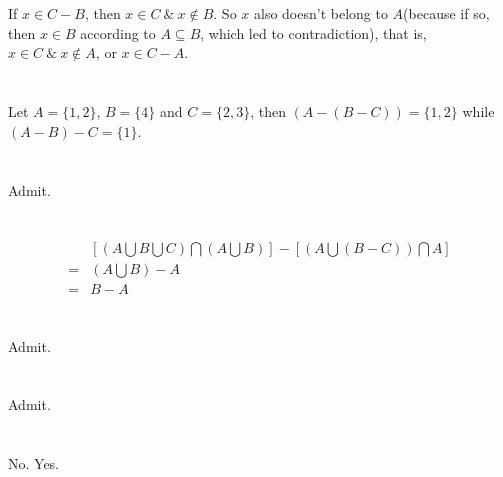 \section{}
If $ x \in C-B $, then $ x\in C\ \&\ x\notin B $. So $x$ also doesn't belong to
$A$(because if so, then $ x\in B $ according to $ A\subseteq B $, which led to 
contradiction), that is, $ x\in C\ \&\ x\notin A $, or $ x \in C-A$.


\section{}
Let $ A = \{1, 2\} $, $ B = \{4\} $ and $ C = \{2, 3\} $, then $ (A-(B-C)) = \{1, 2\} $
while $ (A-B)-C = \{1\} $.


\section{}
Admit.


\section{}
\[ \begin{array}{rl}
    & [(A\bigcup B\bigcup C)\bigcap (A\bigcup B)]-[(A\bigcup(B-C))\bigcap A] \\
  = & (A\bigcup B)-A \\
  = & B-A
\end{array}\]


\section{}
Admit.

\section{}
Admit.

\section{}
No. Yes.
